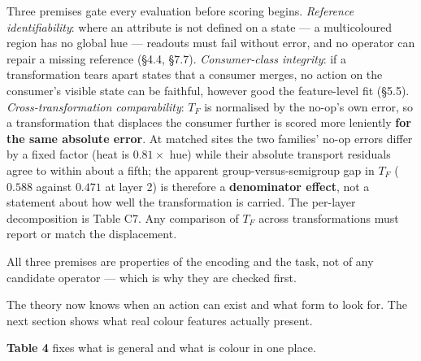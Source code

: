 Three premises gate every evaluation before scoring begins. \textit{Reference identifiability}: where an attribute is not defined on a state --- a multicoloured region has no global hue --- readouts must fail without error, and no operator can repair a missing reference (\S{}4.4, \S{}7.7). \textit{Consumer-class integrity}: if a transformation tears apart states that a consumer merges, no action on the consumer's visible state can be faithful, however good the feature-level fit (\S{}5.5). \textit{Cross-transformation comparability}: $T_F$ is normalised by the no-op's own error, so a transformation that displaces the consumer further is scored more leniently \textbf{for the same absolute error}. At matched sites the two families' no-op errors differ by a fixed factor (heat is $0.81\times$ hue) while their absolute transport residuals agree to within about a fifth; the apparent group-versus-semigroup gap in $T_F$ ($0.588$ against $0.471$ at layer 2) is therefore a \textbf{denominator effect}, not a statement about how well the transformation is carried. The per-layer decomposition is Table C7. Any comparison of $T_F$ across transformations must report or match the displacement.

All three premises are properties of the encoding and the task, not of any candidate operator --- which is why they are checked first.

The theory now knows when an action can exist and what form to look for. The next section shows what real colour features actually present.

\textbf{Table 4} fixes what is general and what is colour in one place.


